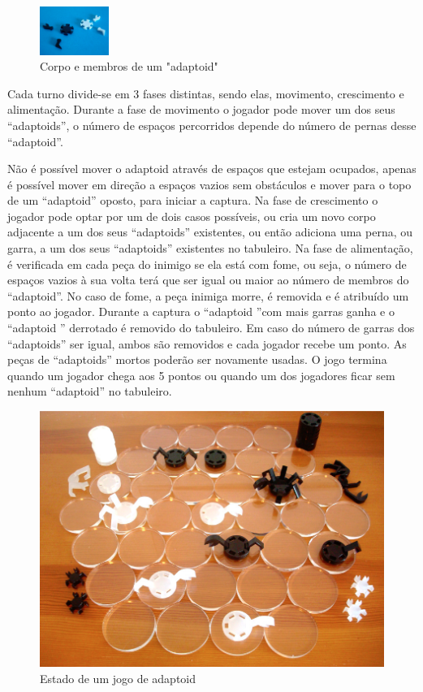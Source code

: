 \documentclass[a4paper]{article}
\begin{document}
\begin{figure}
    	\centering 
	\vspace{-10pt}
   	\includegraphics[width=0.20\textwidth]{adaptoidsDissecados}
    	\caption{Corpo e membros de um "adaptoid"}
\end{figure}

Cada turno divide-se em 3 fases distintas, sendo elas, movimento, crescimento e alimentação. Durante a fase de movimento o jogador pode mover um dos seus “adaptoids”, o número de espaços percorridos depende do número de pernas desse “adaptoid”. 

Não é possível mover o adaptoid através de espaços que estejam ocupados, apenas é possível mover em direção a espaços vazios sem obstáculos e mover para o topo de um “adaptoid” oposto, para iniciar a captura. Na fase de crescimento o jogador pode optar por um de dois casos possíveis, ou cria um novo corpo adjacente a um dos seus “adaptoids” existentes, ou então adiciona uma perna, ou garra, a um dos seus “adaptoids” existentes no tabuleiro. Na fase de alimentação, é verificada em cada peça do inimigo se ela está com fome, ou seja, o número  de espaços vazios à sua volta terá que ser igual ou maior ao número de membros do “adaptoid”. No caso de fome, a peça inimiga morre, é removida e é atribuído um ponto ao jogador. Durante a captura o “adaptoid ”com mais garras ganha e o “adaptoid ” derrotado é removido do tabuleiro. Em caso do número de garras dos “adaptoids” ser igual, ambos são removidos e cada jogador recebe um ponto. As peças de “adaptoids” mortos poderão ser novamente usadas. O jogo termina quando um jogador chega aos 5 pontos ou quando um dos jogadores ficar sem nenhum “adaptoid” no tabuleiro.


\begin{figure}[h]
\includegraphics[scale=1.0]{jogoDecorrer}
\caption{Estado de um jogo de adaptoid}
\centering
\end{figure}
\end{document}
